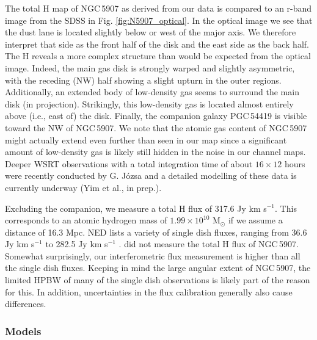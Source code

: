 \documentclass{aa}
\begin{document}
The total H{} map of NGC\,5907 as derived from our data is compared to an r-band image from the SDSS in Fig. \ref{fig:N5907_optical}. In the optical image we see that the dust lane is located slightly below or west of the major axis. We therefore interpret that side as the front half of the disk and the east side as the back half. The H{} reveals a more complex structure than would be expected from the optical image. Indeed, the main gas disk is strongly warped and slightly asymmetric, with the receding (NW) half showing a slight upturn in the outer regions. Additionally, an extended body of low-density gas seems to surround the main disk (in projection). Strikingly, this low-density gas is located almost entirely above (i.e., east of) the disk. Finally, the companion galaxy PGC\,54419 is visible toward the NW of NGC\,5907. We note that the atomic gas content of NGC\,5907 might actually extend even further than seen in our map since a significant amount of low-density gas is likely still hidden in the noise in our channel maps. Deeper WSRT observations with a total integration time of about $16 \times 12$ hours were recently conducted by G. J\'{o}zsa and a detailed modelling of these data is currently underway (Yim et al., in prep.).
\par
Excluding the companion, we measure a total H{} flux of 317.6 Jy km s$^{-1}$. This corresponds to an atomic hydrogen mass of $1.99 \times 10^{10}$ M$_{\odot}$ if we assume a distance of 16.3 Mpc. NED lists a variety of single dish fluxes, ranging from 36.6 Jy km s$^{-1}$ \citep{huchtmeier89} to 282.5 Jy km s$^{-1}$ \citep{springob05}. \cite{shang98} did not measure the total H{} flux of NGC\,5907. Somewhat surprisingly, our interferometric flux measurement is higher than all the single dish fluxes. Keeping in mind the large angular extent of NGC\,5907, the limited HPBW of many of the single dish observations is likely part of the reason for this. In addition, uncertainties in the flux calibration generally also cause differences.


\subsubsection{Models}
\label{sec:N5907_models}
\end{document}
